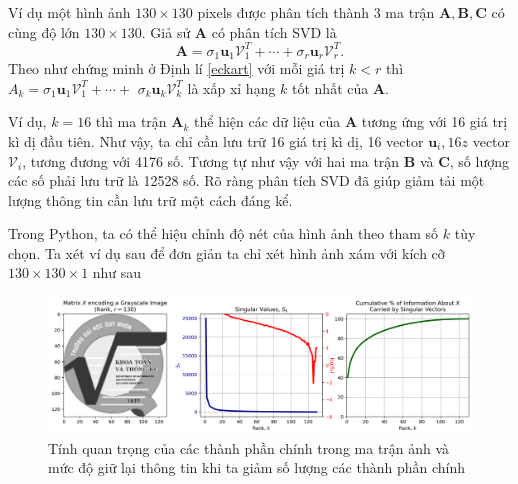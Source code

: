 \documentclass[12pt,a4paper,oneside]{report}
\numberwithin{equation}{section}
\begin{document}
Ví dụ một hình ảnh $130 \times 130$ pixels được phân tích thành 3 ma trận $\mathbf{A}, \mathbf{B}, \mathbf{C}$ có cùng độ lớn $130 \times 130$. Giả sử $\mathbf{A}$ có phân tích SVD là
$$
\mathbf{A}=\sigma_{1} \mathbf{u}_{1} \mathcal{V}_{1}^{T}+\cdots+\sigma_{r} \mathbf{u}_{r} \mathcal{V}_{r}^{T} .
$$
Theo như chứng minh ở Định lí \ref{eckart} với mỗi giá trị $k<r$ thì $A_{k}=\sigma_{1} \mathbf{u}_{1} \mathcal{V}_{1}^{T}+\cdots+$ $\sigma_{k} \mathbf{u}_{k} \mathcal{V}_{k}^{T}$ là xấp xỉ hạng $k$ tốt nhất của $\mathbf{A}$.

Ví dụ, $k=16$ thì ma trận $\mathbf{A}_{k}$ thể hiện các dữ liệu của $\mathbf{A}$ tương ứng với 16 giá trị kì dị đầu tiên. Như vậy, ta chỉ cần lưu trữ 16 giá trị kì dị, 16 vector $\mathbf{u}_{i}, 16z $ vector $\mathcal{V}_{i}$, tương đương với 4176 số. Tương tự như vậy với hai ma trận $\mathbf{B}$ và $\mathbf{C}$, số lượng các số phải lưu trữ là 12528 số. Rõ ràng phân tích SVD đã giúp giảm tải một lượng thông tin cần lưu trữ một cách đáng kể.

Trong  Python, ta có thể hiệu chỉnh độ nét của hình ảnh theo tham số $k$ tùy chọn. Ta xét ví dụ sau để đơn giản ta chỉ xét hình ảnh xám với kích cỡ $130 \times 130 \times1 $ như sau

\begin{figure}[htp]
	\centering
	\includegraphics[scale=0.5]{image-singular-values.png}
	\caption{Tính quan trọng của các thành phần chính trong ma trận ảnh và mức độ giữ lại thông tin khi ta giảm số lượng các thành phần chính}
	\label{fig:svd_sigular}
\end{figure}
\end{document}
